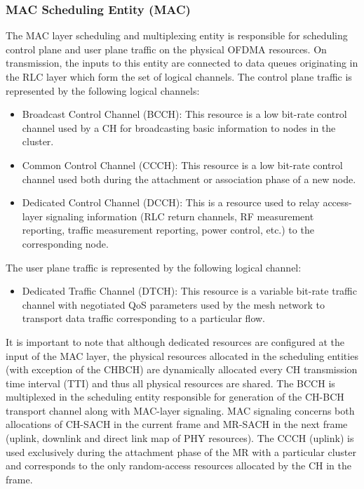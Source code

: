 \documentclass[a4paper,twocolumn,journal]{IEEEtran}
\begin{document}
\subsubsection{MAC Scheduling Entity (MAC)}
The MAC layer scheduling and multiplexing entity is responsible for scheduling control plane and user plane traffic on the physical OFDMA resources. On transmission, the inputs to this entity are connected to data queues originating in the RLC layer which form the set of logical channels. The control plane traffic is represented by the following logical channels:
\begin {itemize}
 \item Broadcast Control Channel (BCCH): This resource is a low bit-rate control channel used by a CH for broadcasting basic information to nodes in the cluster.
\item Common Control Channel (CCCH): This resource is a low bit-rate control channel used both during the attachment or association phase of a new node.
\item Dedicated Control Channel (DCCH): This is a resource used to relay access-layer signaling information (RLC return channels, RF measurement reporting, traffic measurement reporting, power control, etc.) to the corresponding node.
\end{itemize}
The user plane traffic is represented by the following logical channel:
\begin {itemize}
\item Dedicated Traffic Channel (DTCH): This resource is a variable bit-rate traffic channel with negotiated QoS parameters used by the mesh network to transport data traffic corresponding to a particular flow.
\end {itemize}
It is important to note that although dedicated resources are configured at the input of the MAC layer, the physical resources allocated in the scheduling entities (with exception of the CHBCH) are dynamically allocated every CH transmission time interval (TTI) and thus all physical resources are shared. The BCCH is multiplexed in the scheduling entity responsible for generation of the CH-BCH transport channel along with MAC-layer signaling. MAC signaling concerns both allocations of CH-SACH in the current frame and MR-SACH in the next frame (uplink, downlink and direct link map of PHY resources). The CCCH (uplink) is used exclusively during the attachment phase of the MR with a particular cluster and corresponds to the only random-access resources allocated by the CH in the frame. 
\end{document}
